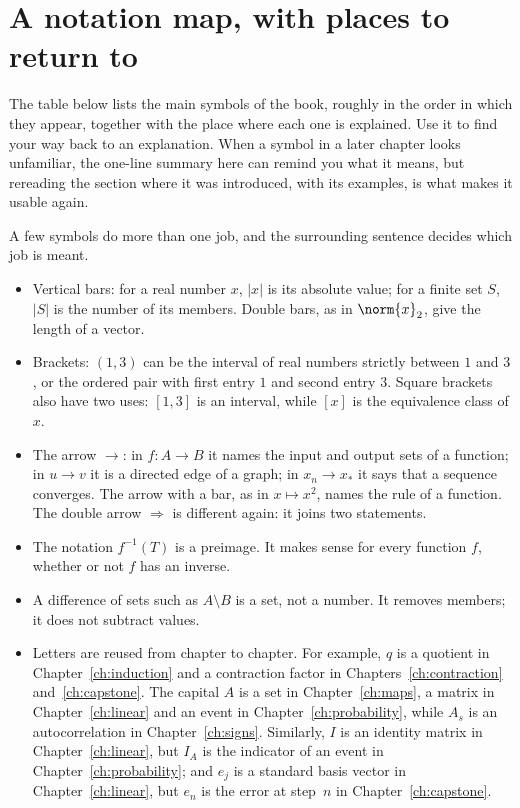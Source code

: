 \section{A notation map, with places to return to}\label{appE:sec:notation}
The table below lists the main symbols of the book, roughly in the order in which they appear, together with the place where each one is explained. Use it to find your way back to an explanation. When a symbol in a later chapter looks unfamiliar, the one-line summary here can remind you what it means, but rereading the section where it was introduced, with its examples, is what makes it usable again.

A few symbols do more than one job, and the surrounding sentence decides which job is meant.
\begin{itemize}
\item Vertical bars: for a real number $x$, $|x|$ is its absolute value; for a finite set $S$, $|S|$ is the number of its members. Double bars, as in $\norm{x}_2$, give the length of a vector.
\item Brackets: $(1,3)$ can be the interval of real numbers strictly between $1$ and $3$, or the ordered pair with first entry $1$ and second entry $3$. Square brackets also have two uses: $[1,3]$ is an interval, while $[x]$ is the equivalence class of $x$.
\item The arrow $\to$: in $f:A\to B$ it names the input and output sets of a function; in $u\to v$ it is a directed edge of a graph; in $x_n\to x_*$ it says that a sequence converges. The arrow with a bar, as in $x\mapsto x^2$, names the rule of a function. The double arrow $\Rightarrow$ is different again: it joins two statements.
\item The notation $f^{-1}(T)$ is a preimage. It makes sense for every function $f$, whether or not $f$ has an inverse.
\item A difference of sets such as $A\setminus B$ is a set, not a number. It removes members; it does not subtract values.
\item Letters are reused from chapter to chapter. For example, $q$ is a quotient in Chapter~\ref{ch:induction} and a contraction factor in Chapters~\ref{ch:contraction} and~\ref{ch:capstone}. The capital $A$ is a set in Chapter~\ref{ch:maps}, a matrix in Chapter~\ref{ch:linear} and an event in Chapter~\ref{ch:probability}, while $A_s$ is an autocorrelation in Chapter~\ref{ch:signs}. Similarly, $I$ is an identity matrix in Chapter~\ref{ch:linear}, but $I_A$ is the indicator of an event in Chapter~\ref{ch:probability}; and $e_j$ is a standard basis vector in Chapter~\ref{ch:linear}, but $e_n$ is the error at step~$n$ in Chapter~\ref{ch:capstone}.
\end{itemize}

